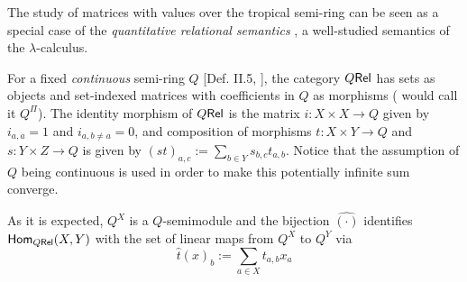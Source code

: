 
The study of matrices with values over the tropical semi-ring can be seen as a special case of the
\emph{quantitative relational semantics} \cite{Manzo2013}, a well-studied semantics of the $\lambda$-calculus. 

For a fixed \emph{continuous} semi-ring $Q$ [Def. II.5, \cite{Manzo2013}], the category $Q \mathsf{Rel}$ has sets as objects and set-indexed matrices with coefficients in $Q$ as morphisms (\cite{Manzo2013} would call it $Q^\Pi$).
The identity morphism of $Q \mathsf{Rel}$ is the matrix $i:X\times X\to Q$ given by $i_{a,a}=1$ and $i_{a,b\neq a}=0$, and composition of morphisms $t:X\times Y\to Q$ and $s:Y\times Z\to Q$ is given by 
$(st)_{a,c}:=\sum\limits_{b\in Y} s_{b,c}t_{a,b}$.
Notice that the assumption of $Q$ being continuous 
 is used in order to make this potentially infinite sum converge.
 
 As it is expected, $Q^X$ is a $Q$-semimodule and the bijection $\hat{(\cdot)}$ identifies $\mathsf{Hom}_{Q \mathsf{Rel}}(X,Y)$ with the set of linear maps from $Q^X$ to $Q^Y$ via
 \begin{equation}
 \hat t(x)_b:=\sum\limits_{a\in X} t_{a,b}x_a
 \end{equation}
 

